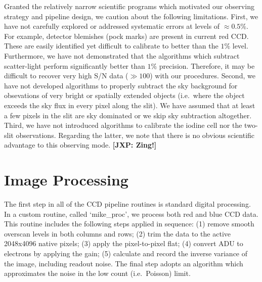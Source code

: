 \documentclass[12pt,preprint]{aastex}
\begin{document}
Granted the relatively narrow scientific programs which
motivated our observing strategy and pipeline design,
we caution about the following limitations.
First, we have not carefully explored or addressed 
systematic errors at levels of $\approx 0.5\%$.
For example, detector blemishes (pock marks) are present in 
current red CCD.  These are easily identified yet difficult to
calibrate to better than the $1\%$ level.  Furthermore,
we have not demonstrated that the algorithms which subtract
scatter-light perform significantly better than $1\%$ precision.
Therefore, it may be difficult to recover very high S/N data
($\gg 100$) with our procedures.
Second, we have not developed algorithms to properly subtract
the sky background for obsevations of very bright
or spatially extended objects (i.e.\ where the object 
exceeds the sky flux in every pixel along the slit).
We have assumed that at least a few pixels in the slit are
sky dominated or we skip sky subtraction altogether.
Third, we have not introduced algorithms to calibrate
the iodine cell nor the two-slit observations.
Regarding the latter, we note that there is no obvious
scientific advantage to this observing mode. {\bf [JXP: Zing!]}


\section{Image Processing}
\label{sec:proc}

The first step in all of the CCD pipeline routines is standard
digital processing.  In a custom routine, called `mike\_proc',
we process both red and blue CCD data. 
This routine includes the following steps applied in sequence:
(1) remove smooth overscan levels in both columns and rows;
(2) trim the data to the active 2048x4096 native pixels;
(3) apply the pixel-to-pixel flat; %
(4) convert ADU to electrons by applying the gain; 
(5) calculate and record the inverse variance of the image, 
including readout noise. 
The final step adopts an algorithm which 
approximates the noise in the low count (i.e.\ Poisson) limit.
\end{document}
